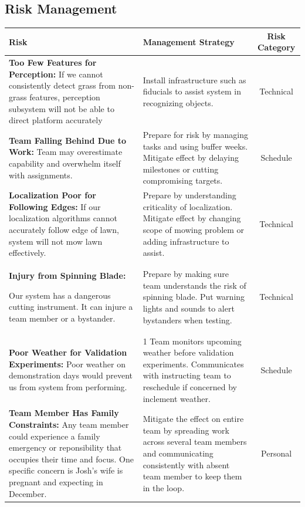 \documentclass[12pt]{extarticle}
\begin{document}
\subsection{Risk Management}
\begin{table}[H]
\def\arraystretch{1.7}

\begin{tabular}{p{7cm}p{6cm}c}
 {Risk} &  {Management Strategy} &  {Risk Category}\\
\hline 
 \textbf{Too Few Features for Perception:} 
If we cannot consistently detect grass from non-grass features, perception subsystem will not be able to direct platform accurately
&
Install infrastructure such as fiducials to assist system in recognizing objects.
&
Technical\\

 \textbf{Team Falling Behind Due to Work:} 
Team may overestimate capability and overwhelm itself with assignments.
&
Prepare for risk by managing tasks and using buffer weeks.  Mitigate effect by delaying milestones or cutting compromising targets.
&
Schedule\\
 \textbf{Localization Poor for Following Edges:} 
If our localization algorithms cannot accurately follow edge of lawn, system will not mow lawn effectively.
&
Prepare by understanding criticality of localization.  Mitigate effect by changing scope of mowing problem or adding infrastructure to assist.
&
Technical\\
 \textbf{Injury from Spinning Blade:} 

Our system has a dangerous cutting instrument.  It can injure a team member or a bystander.
&
Prepare by making sure team understands the risk of spinning blade.  Put warning lights and sounds to alert bystanders when testing.
&
Technical\\

 \textbf{Poor Weather for Validation Experiments:} 
Poor weather on demonstration days would prevent us from system from performing.
&1
Team monitors upcoming weather before validation experiments.  Communicates with instructing team to reschedule if concerned by inclement weather.
&
Schedule\\

 \textbf{Team Member Has Family Constraints:} 
Any team member could experience a family emergency or reponsibility that occupies their time and focus.  One specific concern is Josh's wife is pregnant and expecting in December.
&
Mitigate the effect on entire team by spreading work across several team members and communicating consistently with absent team member to keep them in the loop.
&
Personal\\


\end{tabular}
\end{table}
\end{document}
